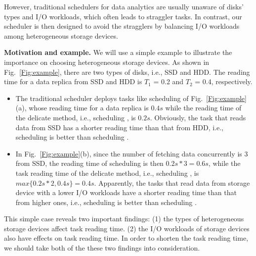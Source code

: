 \documentclass[conference]{IEEEtran}
\begin{document}
However, traditional schedulers for data analytics are usually unaware of disks' types and I/O workloads, which often leads to straggler tasks. In contrast, our scheduler is then designed to avoid the stragglers by balancing I/O workloads among heterogeneous storage devices.

\textbf{Motivation and example.}
We will use a simple example to illustrate the importance on choosing heterogeneous storage devices. As shown in Fig.~\ref{Fig:example}, there are two types of disks, i.e., SSD and HDD. The reading time for a data replica from SSD and HDD is $T_1$ = 0.2 and $T_2$ = 0.4, respectively. 
\begin{itemize}
	\item The traditional scheduler deploys tasks like scheduling \uppercase\expandafter{} of Fig.~\ref{Fig:example}(a), whose reading time for a data replica is $0.4s$ while the reading time of the delicate method, i.e., scheduling \uppercase\expandafter{}, is $0.2s$. Obviously, the task that reads data from SSD has a shorter reading time than that from HDD, i.e., scheduling \uppercase\expandafter{} is better than scheduling \uppercase\expandafter{}.

	\item In Fig.~\ref{Fig:example}(b), since the number of fetching data concurrently is 3 from SSD, the reading time of scheduling \uppercase\expandafter{} is then $0.2s * 3 = 0.6s$, while the task reading time of the delicate method, i.e., scheduling \uppercase\expandafter{}, is $max\{0.2s * 2, 0.4s\} = 0.4s$. Apparently, the tasks that read data from storage device with a lower I/O workloads have a shorter reading time than that from higher ones, i.e., scheduling \uppercase\expandafter{} is better than scheduling \uppercase\expandafter{}.
\end{itemize}

This simple case reveals two important findings: (1) the types of heterogeneous storage devices affect task reading time. (2) the I/O workloads of storage devices also have effects on task reading time. In order to shorten the task reading time, we should take both of the these two findings into consideration.

\end{document}
